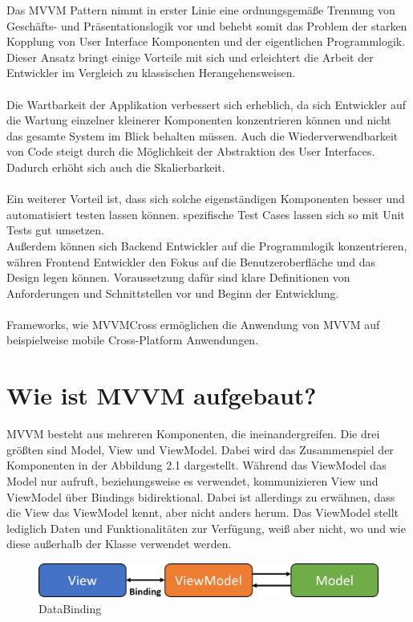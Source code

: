 \documentclass[titlepage=false,12pt]{scrreprt}
\begin{document}
Das MVVM Pattern nimmt in erster Linie eine ordnungsgemäße Trennung von Geschäfts- und Präsentationslogik vor und
behebt somit das Problem der starken Kopplung von User Interface Komponenten und der eigentlichen Programmlogik.
Dieser Ansatz bringt einige Vorteile mit sich und erleichtert die Arbeit der Entwickler im Vergleich zu klassischen
Herangehensweisen.\\
\\
Die Wartbarkeit der Applikation verbessert sich erheblich, da sich Entwickler auf die Wartung einzelner kleinerer
Komponenten konzentrieren können und nicht das gesamte System im Blick behalten müssen. Auch die Wiederverwendbarkeit
von Code steigt durch die Möglichkeit der Abstraktion des User Interfaces. Dadurch erhöht sich auch die Skalierbarkeit.\\
\\
Ein weiterer Vorteil ist, dass sich solche eigenständigen Komponenten besser und automatisiert testen lassen können.
spezifische Test Cases lassen sich so mit Unit Tests gut umsetzen.
\\
Außerdem können sich Backend Entwickler auf die Programmlogik konzentrieren, währen Frontend Entwickler den Fokus
auf die Benutzeroberfläche und das Design legen können. Voraussetzung dafür sind klare Definitionen von
Anforderungen und Schnittstellen vor und Beginn der Entwicklung.\\
\\
Frameworks, wie MVVMCross ermöglichen die Anwendung von MVVM auf beispielweise mobile Cross-Platform Anwendungen.

\chapter{Wie ist MVVM aufgebaut?}

MVVM besteht aus mehreren Komponenten, die ineinandergreifen. Die drei 
größten sind Model, View und ViewModel. Dabei wird das Zusammenspiel 
der Komponenten in der Abbildung 2.1 dargestellt. Während das ViewModel das Model
nur aufruft, beziehungsweise es verwendet, kommunizieren View und ViewModel über
Bindings bidirektional. Dabei ist allerdings zu erwähnen, dass die View das ViewModel
kennt, aber nicht anders herum. Das ViewModel stellt lediglich Daten und Funktionalitäten
zur Verfügung, weiß aber nicht, wo und wie diese außerhalb der Klasse verwendet werden.

\begin{figure}[h]
	\includegraphics[width=\textwidth]{MVVM.png}
	\caption[]{DataBinding}
\end{figure}
\end{document}
